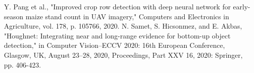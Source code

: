 \documentclass[conference]{IEEEtran}
\begin{document}
\begin{thebibliography}{00}
 Y. Pang et al., "Improved crop row detection with deep neural network for early-season maize stand count in UAV imagery," Computers and Electronics in Agriculture, vol. 178, p. 105766, 2020.
 N. Samet, S. Hicsonmez, and E. Akbas, "Houghnet: Integrating near and long-range evidence for bottom-up object detection," in Computer Vision–ECCV 2020: 16th European Conference, Glasgow, UK, August 23–28, 2020, Proceedings, Part XXV 16, 2020: Springer, pp. 406-423. 
\end{thebibliography}

\vspace{12pt}
\end{document}
